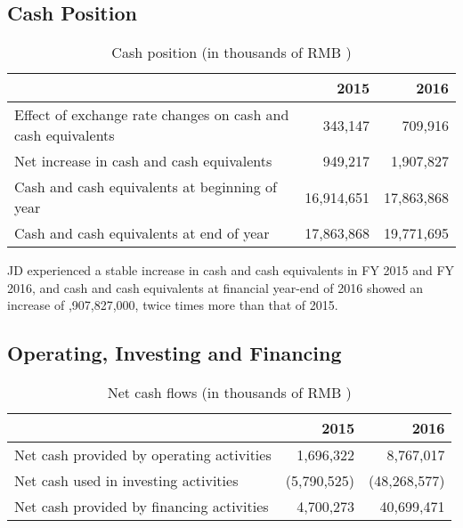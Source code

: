 \subsection{Cash Position}
\begin{table}[H]	
	\begin{center}
		\begin{tabular}{lrr}
			\toprule
			&\textbf{2015}&\textbf{2016}\\
			\midrule
			Effect of exchange rate changes on cash and cash equivalents &	343,147&	709,916\\
			Net increase in cash and cash equivalents &949,217&	1,907,827\\
			Cash and cash equivalents at beginning of year 	&16,914,651&	17,863,868\\
			Cash and cash equivalents at end of year&	17,863,868	&19,771,695\\
			\bottomrule
		\end{tabular}
	\end{center}
	\caption{Cash position (in thousands of RMB \textyen)}\label{table:1}
\end{table}

JD experienced a stable increase in cash and cash equivalents in FY 2015 and FY 2016, and cash and cash equivalents at financial year-end of 2016 showed an increase of ,907,827,000, twice times more than that of 2015.

\subsection{Operating, Investing and Financing}

\begin{table}[H]	
	\begin{center}
		\begin{tabular}{lrr}
			\toprule
			&\textbf{2015}&\textbf{2016}\\
			\midrule
			Net cash provided by operating activities&	1,696,322&	8,767,017\\
			Net cash used in investing activities&	(5,790,525)&	(48,268,577)\\
			Net cash provided by financing activities&	4,700,273	&40,699,471\\
			\bottomrule
		\end{tabular}
	\end{center}
	\caption{Net cash flows (in thousands of RMB \textyen)}\label{table:1}
\end{table}

